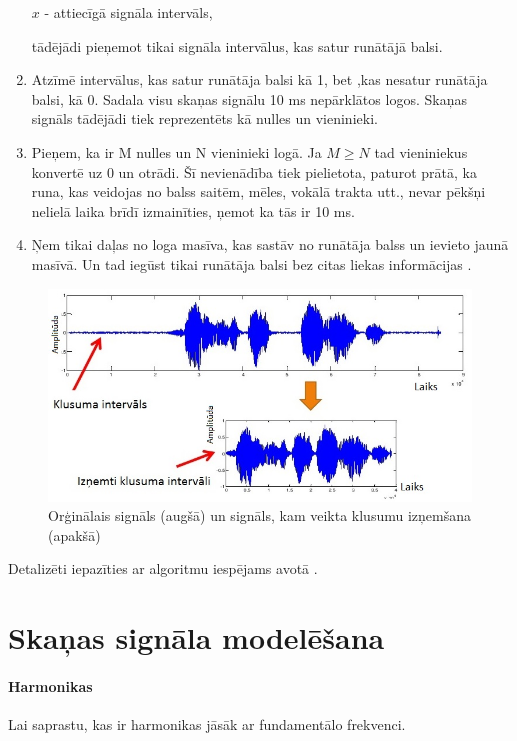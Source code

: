 \documentclass[12pt,paper=A4]{report}
\begin{document}
\begin{enumerate}
$x$ - attiecīgā signāla intervāls,


tādējādi pieņemot tikai signāla intervālus, kas satur runātājā balsi.
\item Atzīmē intervālus, kas satur runātāja balsi kā 1, bet ,kas nesatur runātāja balsi, kā 0. Sadala visu skaņas signālu 10 ms nepārklātos logos. Skaņas signāls tādējādi tiek reprezentēts kā nulles un vieninieki.
\item Pieņem, ka ir M nulles un N vieninieki logā. Ja $M \geq N$ tad vieniniekus konvertē uz 0 un otrādi. Šī nevienādība tiek pielietota, paturot prātā, ka runa, kas veidojas no balss saitēm, mēles, vokālā trakta utt., nevar pēkšņi nelielā laika brīdī izmainīties, ņemot ka tās ir 10 ms.
\item Ņem tikai daļas no loga masīva, kas sastāv no runātāja balss un ievieto jaunā masīvā. Un tad iegūst tikai runātāja balsi bez citas liekas informācijas \cite{noise1}. 

\end{enumerate}

\begin{figure}[H] \centering
\includegraphics[width=1.00\textwidth]{silent} 
\caption{Orģinālais signāls (augšā) un signāls, kam veikta klusumu izņemšana (apakšā) \cite{dtw8}}  \label{silence} 
\end{figure}

Detalizēti iepazīties ar algoritmu iespējams avotā \cite{dtw24}.

\chapter{Skaņas signāla modelēšana}

\subsubsection{Harmonikas}
Lai saprastu, kas ir harmonikas jāsāk ar fundamentālo frekvenci.
\end{document}
